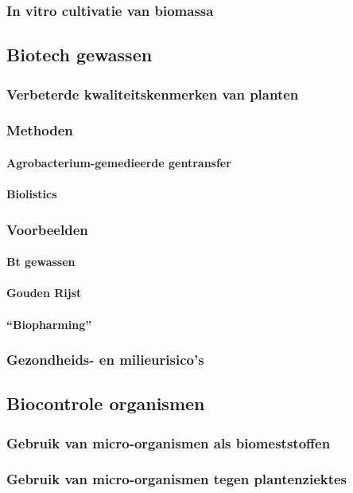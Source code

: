 \documentclass[a4paper,kul]{kulakarticle} %
\begin{document}
\subsubsection{In vitro cultivatie van biomassa}
\subsection{Biotech gewassen}
\subsubsection{Verbeterde kwaliteitskenmerken van planten}
\subsubsection{Methoden}
\paragraph{Agrobacterium-gemedieerde gentransfer}
\paragraph{Biolistics}
\subsubsection{Voorbeelden}
\paragraph{Bt gewassen}
\paragraph{Gouden Rijst}
\paragraph{“Biopharming”}
\subsubsection{Gezondheids- en milieurisico’s}
\subsection{Biocontrole organismen}
\subsubsection{Gebruik van micro-organismen als biomeststoffen}
\subsubsection{Gebruik van micro-organismen tegen plantenziektes}
\end{document}
